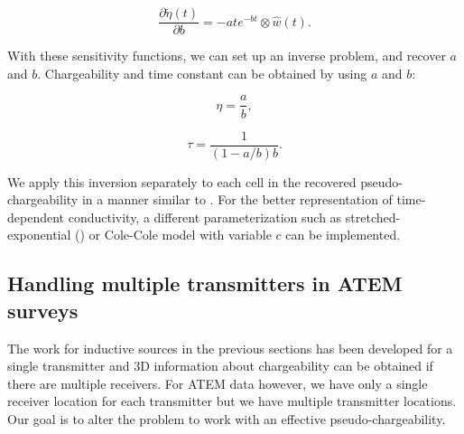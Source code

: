 \documentclass[extra,mreferee]{gji}
\newcommand{\peta}{\tilde{\eta}}
\begin{document}
\begin{linenomath*}
\begin{equation}
  \frac{\partial \peta(t)}{\partial b} = -ate^{-bt} \otimes \hat{w}(t).
\end{equation}
\end{linenomath*}
With these sensitivity functions, we can set up an inverse problem, and recover $a$ and $b$. 
Chargeability and time constant can be obtained by using $a$ and $b$:
\begin{linenomath*}
\begin{equation}
  \eta =  \frac{a}{b},
\end{equation}
\end{linenomath*}
\begin{linenomath*}
\begin{equation}
  \tau =  \frac{1}{(1-a/b)b}.
\end{equation}
\end{linenomath*}
We apply this inversion separately to each cell in the recovered pseudo-chargeability  in a manner similar to \cite[]{Yuval1997}.
For the better representation of time-dependent conductivity, a different parameterization such as stretched-exponential (\cite{Kohlrausch1854}) or Cole-Cole model with variable $c$ can be implemented. 

\subsection{Handling multiple transmitters in ATEM surveys}
\label{subsection: Handling multiple transmitters in ATEM surveys}
The work for inductive sources in the previous sections has been developed for a single transmitter and 3D information about chargeability can be obtained if there are multiple receivers. For ATEM data however, we have only a single receiver location for each transmitter but we have multiple transmitter locations. 
Our goal is to alter the problem to work with an effective pseudo-chargeability. 
\end{document}

